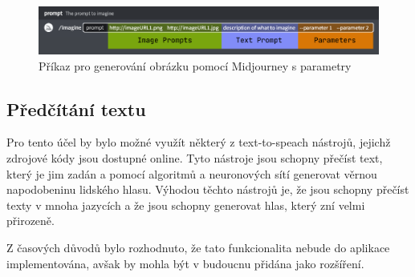 \begin{figure}[H]
    \centering
    \includegraphics[width=1\textwidth]{resources/figures/midjourney_prompts_params.png}
    \caption{Příkaz pro generování obrázku pomocí Midjourney s parametry\cite{midjourney}}
    \label{fig:mj_prompts_params}
\end{figure}

\subsection{Předčítání textu}
Pro tento účel by bylo možné využít některý z text-to-speach nástrojů, jejichž zdrojové kódy jsou dostupné online. Tyto nástroje jsou schopny přečíst text, který je jim zadán a pomocí algoritmů a neuronových sítí generovat věrnou napodobeninu lidského hlasu. Výhodou těchto nástrojů je, že jsou schopny přečíst texty v mnoha jazycích a že jsou schopny generovat hlas, který zní velmi přirozeně.

Z časových důvodů bylo rozhodnuto, že tato funkcionalita nebude do aplikace implementována, avšak by mohla být v budoucnu přidána jako rozšíření.